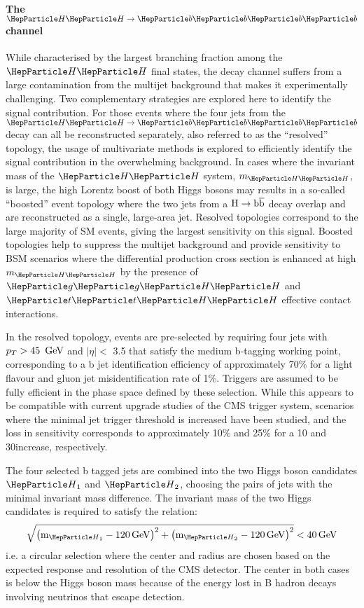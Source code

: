 \paragraph{The $\HH\to\bbbb$ channel}

While characterised by the largest branching fraction among the $\HH$ final states, the \bbbb decay channel suffers from a large contamination from the multijet background that makes it experimentally challenging.
Two complementary strategies are explored here to identify the signal contribution.
For those events where the four jets from the $\HH\to\bbbb$ decay can all be reconstructed separately, also referred to as the ``resolved'' topology, the usage of multivariate methods is explored to efficiently identify the signal contribution in the overwhelming background.
In cases where the invariant mass of the $\HH$ system, $m_{\HH}$, is large, the high Lorentz boost of both Higgs bosons may results in a so-called ``boosted'' event topology where the two jets from a $\text{H}\rightarrow\text{b}\overline{\text{b}}$ decay overlap and are reconstructed as a single, large-area jet.
Resolved topologies correspond to the large majority of SM \HH events, giving the largest sensitivity on this signal.
Boosted topologies help to suppress the multijet background and provide sensitivity to BSM scenarios where the differential \HH production cross section is enhanced at high $m_{\HH}$ by the presence of $\Pg\Pg\HH$ and $\PQt\PQt\HH$ effective contact interactions.

In the resolved topology, events are pre-selected by requiring four jets with $p_{T} > 45~\,\text{Ge\hspace{-.08em}V}$ and $|\eta| <$ 3.5 that satisfy the medium b-tagging working point, corresponding to a b jet identification efficiency of approximately 70\% for a light  flavour and gluon jet misidentification rate of  1\%.
Triggers are assumed to be fully efficient in the phase space defined by these selection.
While this appears to be compatible with current upgrade studies of the CMS trigger system, scenarios where the minimal jet trigger \pt threshold is increased have been studied, and the loss in sensitivity corresponds to approximately 10\% and 25\% for a 10 and 30\GeV increase, respectively.

The four selected b tagged jets are combined into the two Higgs boson candidates $\PH_1$ and $\PH_2$, choosing the pairs of jets with the minimal invariant mass difference.
The invariant mass of the two Higgs candidates is required to satisfy the relation:
\begin{equation}
\sqrt{ \left( \text{m}_{\PH_1} - 120\GeV\right)^2 + \left( \text{m}_{\PH_2} - 120\GeV\right)^2 } < 40\GeV
\end{equation}
i.e. a circular selection where the center and radius are chosen based on the expected response and resolution of the CMS detector.
The center in both cases is below the Higgs boson mass because of the energy lost in B hadron decays involving neutrinos that escape detection.

